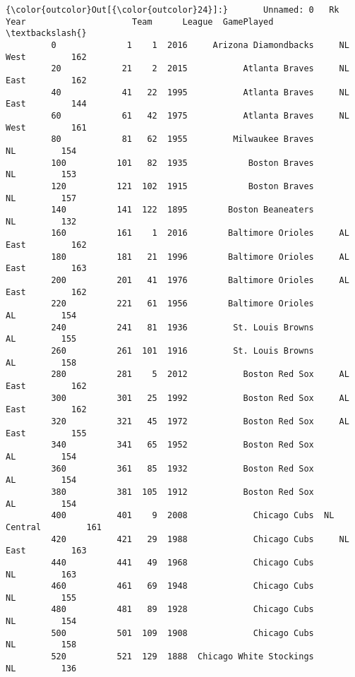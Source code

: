 \documentclass[11pt]{article}
\begin{document}
\begin{Verbatim}[commandchars=\\\{\}]
{\color{outcolor}Out[{\color{outcolor}24}]:}       Unnamed: 0   Rk  Year                     Team      League  GamePlayed  \textbackslash{}
         0              1    1  2016     Arizona Diamondbacks     NL West         162   
         20            21    2  2015           Atlanta Braves     NL East         162   
         40            41   22  1995           Atlanta Braves     NL East         144   
         60            61   42  1975           Atlanta Braves     NL West         161   
         80            81   62  1955         Milwaukee Braves          NL         154   
         100          101   82  1935            Boston Braves          NL         153   
         120          121  102  1915            Boston Braves          NL         157   
         140          141  122  1895        Boston Beaneaters          NL         132   
         160          161    1  2016        Baltimore Orioles     AL East         162   
         180          181   21  1996        Baltimore Orioles     AL East         163   
         200          201   41  1976        Baltimore Orioles     AL East         162   
         220          221   61  1956        Baltimore Orioles          AL         154   
         240          241   81  1936         St. Louis Browns          AL         155   
         260          261  101  1916         St. Louis Browns          AL         158   
         280          281    5  2012           Boston Red Sox     AL East         162   
         300          301   25  1992           Boston Red Sox     AL East         162   
         320          321   45  1972           Boston Red Sox     AL East         155   
         340          341   65  1952           Boston Red Sox          AL         154   
         360          361   85  1932           Boston Red Sox          AL         154   
         380          381  105  1912           Boston Red Sox          AL         154   
         400          401    9  2008             Chicago Cubs  NL Central         161   
         420          421   29  1988             Chicago Cubs     NL East         163   
         440          441   49  1968             Chicago Cubs          NL         163   
         460          461   69  1948             Chicago Cubs          NL         155   
         480          481   89  1928             Chicago Cubs          NL         154   
         500          501  109  1908             Chicago Cubs          NL         158   
         520          521  129  1888  Chicago White Stockings          NL         136   

\end{Verbatim}
\end{document}
